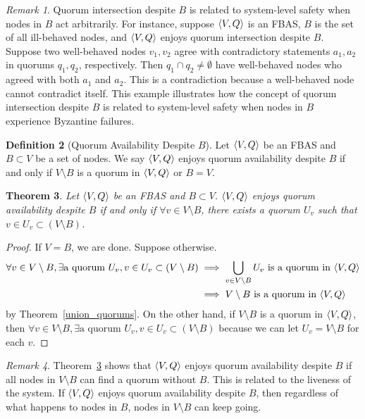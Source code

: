 \documentclass[12pt, psamsfonts]{amsart}
\newtheorem{thm}{Theorem}[subsection]
\theoremstyle{definition}
\newtheorem{defn}[thm]{Definition}
\theoremstyle{remark}
\newtheorem{rem}[thm]{Remark}
\numberwithin{equation}{subsection}
\begin{document}
\begin{rem}
    Quorum intersection despite $B$ is related to system-level safety when nodes in $B$ act arbitrarily.
    For instance, suppose $\ev{V, Q}$ is an FBAS, $B$ is the set of all ill-behaved nodes, and $\ev{V, Q}$ enjoys quorum intersection despite $B$.
    Suppose two well-behaved nodes $v_1, v_2$ agree with contradictory statements $a_1, a_2$ in quorums $q_1, q_2$, respectively.
    Then $q_1 \cap q_2 \ne \emptyset$ have well-behaved nodes who agreed with both $a_1$ and $a_2$.
    This is a contradiction because a well-behaved node cannot contradict itself.
    This example illustrates how the concept of quorum intersection despite $B$ is related to system-level safety when nodes in $B$ experience Byzantine failures.
\end{rem}

\begin{defn}[Quorum Availability Despite $B$]\label{def_quorum_availability}
    Let $\ev{V, Q}$ be an FBAS and $B \subset V$ be a set of nodes.
    We say $\ev{V, Q}$ enjoys quorum availability despite $B$ if and only if $V \setminus B$ is a quorum in $\ev{V, Q}$ or $B = V$.
\end{defn}

\begin{thm}\label{quorum_availability_equivalence_condition}
    Let $\ev{V, Q}$ be an FBAS and $B \subset V$.
    $\ev{V, Q}$ enjoys quorum availability despite $B$ if and only if $\forall v \in V \setminus B$, there exists a quorum $U_v$ such that $v \in U_v \subset (V \setminus B)$.
\end{thm}

\begin{proof}
    If $V = B$, we are done.
    Suppose otherwise.
    \begin{align*}
        \forall v \in V \setminus B, \exists \text{a quorum $U_v$}, v \in U_v \subset (V \setminus B)
            &\implies \bigcup_{v \in V \setminus B} U_v \text{ is a quorum in $\ev{V, Q}$} \\
            &\implies \text{$V \setminus B$ is a quorum in $\ev{V, Q}$}
    \end{align*}
    by Theorem~\ref{union_quorums}.
    On the other hand, if $V \setminus B$ is a quorum in $\ev{V, Q}$, then $\forall v \in V \setminus B, \exists \text{a quorum $U_v$}, v \in U_v \subset (V \setminus B)$ because we can let $U_v = V \setminus B$ for each $v$.
\end{proof}

\begin{rem}
    Theorem~\ref{quorum_availability_equivalence_condition} shows that $\ev{V, Q}$ enjoys quorum availability despite $B$ if all nodes in $V \setminus B$ can find a quorum without $B$.
    This is related to the liveness of the system.
    If $\ev{V, Q}$ enjoys quorum availability despite $B$, then regardless of what happens to nodes in $B$, nodes in $V \setminus B$ can keep going.
\end{rem}
\end{document}
